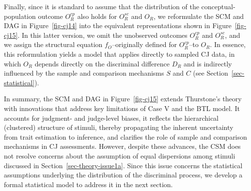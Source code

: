 \documentclass[
  authoryear,
  review,
  1p]{elsarticle}
\begin{document}
Finally, since it is standard to assume that the distribution of the
conceptual-population outcome \(O^{cp}_{R}\) also holds for
\(O^{sc}_{R}\) and \(O_{R}\), we reformulate the SCM and DAG in
Figure~\ref{fig-cj14} into the equivalent representations shown in
Figure~\ref{fig-cj15}. In this latter version, we omit the unobserved
outcomes \(O^{cp}_{R}\) and \(O^{sc}_{R}\), and we assign the structural
equation \(f_{O}\)--originally defined for \(O^{cp}_{R}\)--to \(O_{R}\).
In essence, this reformulation yields a model that applies directly to
sampled CJ data, in which \(O_{R}\) depends directly on the discriminal
difference \(D_{R}\) and is indirectly influenced by the sample and
comparison mechanisms \(S\) and \(C\) (see
Section~\ref{sec-statistical}).

In summary, the SCM and DAG in Figure~\ref{fig-cj15} extends Thurstone's
theory with innovations that address key limitations of Case V and the
BTL model. It accounts for judgment- and judge-level biases, it reflects
the hierarchical (clustered) structure of stimuli, thereby propagating
the inherent uncertainty from trait estimation to inference, and
clarifies the role of sample and comparison mechanisms in CJ
assessments. However, despite these advances, the CSM does not resolve
concerns about the assumption of equal dispersions among stimuli
discussed in Section~\ref{sec-theory-issue1a}. Since this issue concerns
the statistical assumptions underlying the distribution of the
discriminal process, we develop a formal statistical model to address it
in the next section.
\end{document}
